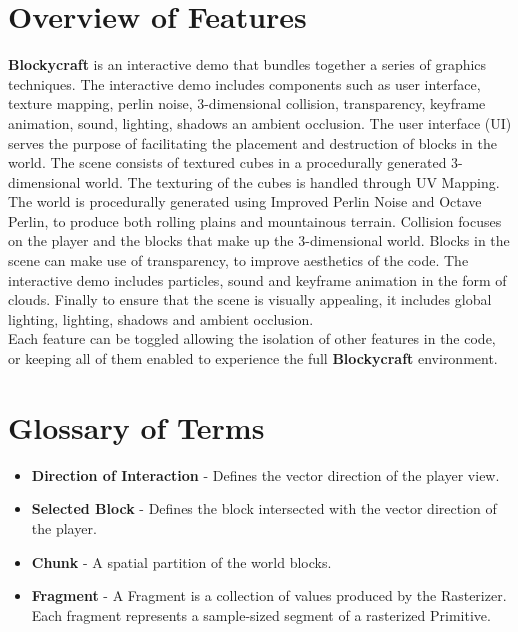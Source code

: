 \documentclass{book}
\newcommand{\Blockycraft}{\textbf{Blockycraft}}
\begin{document}
\section{Overview of Features}
\Blockycraft{} is an interactive demo that bundles together a series of graphics techniques.  The interactive demo includes components such as user interface, texture mapping, perlin noise, 3-dimensional collision, transparency, keyframe animation, sound, lighting, shadows an ambient occlusion.  The user interface (UI) serves the purpose of facilitating the placement and destruction of blocks in the world.  The scene consists of textured cubes in a procedurally generated 3-dimensional world.  The texturing of the cubes is handled through UV Mapping.  The world is procedurally generated using Improved Perlin Noise and Octave Perlin, to produce both rolling plains and mountainous terrain.  Collision focuses on the player and the blocks that make up the 3-dimensional world.  Blocks in the scene can make use of transparency, to improve aesthetics of the code.  The interactive demo includes particles, sound and keyframe animation in the form of clouds.  Finally to ensure that the scene is visually appealing, it includes global lighting, lighting, shadows and ambient occlusion.
\\
Each feature can be toggled allowing the isolation of other features in the code, or keeping all of them enabled to experience the full \Blockycraft{} environment.

\section{Glossary of Terms}
\begin{itemize}
\item \textbf{Direction of Interaction} - Defines the vector direction of the player view.
\item \textbf{Selected Block} - Defines the block intersected with the vector direction of the player.
\item \textbf{Chunk} - A spatial partition of the world blocks.
\item \textbf{Fragment} - A Fragment is a collection of values produced by the Rasterizer. Each fragment represents a sample-sized segment of a rasterized Primitive.
\end{itemize}

\end{document}
